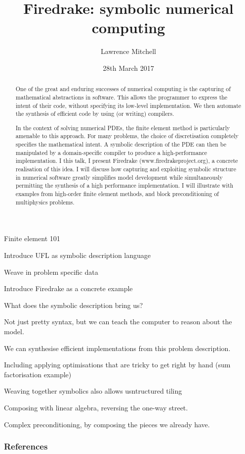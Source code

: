 \documentclass[presentation]{beamer}
\date{28th March 2017}
\author{Lawrence Mitchell\inst{1,*}}
\institute{
\inst{1}Departments of Computing and Mathematics, Imperial College
London

\inst{*}\texttt{lawrence.mitchell@imperial.ac.uk}
}
\title{Firedrake: symbolic numerical computing}
\begin{document}
\maketitle

\begin{abstract}
  One of the great and enduring successes of numerical computing is
  the capturing of mathematical abstractions in software.  This allows
  the programmer to express the intent of their code, without
  specifying its low-level implementation.  We then automate the
  synthesis of efficient code by using (or writing) compilers.

  In the context of solving numerical PDEs, the finite element method
  is particularly amenable to this approach.  For many problems, the
  choice of discretisation completely specifies the mathematical
  intent.  A symbolic description of the PDE can then be manipulated
  by a domain-specific compiler to produce a high-performance
  implementation.  I this talk, I present Firedrake
  (www.firedrakeproject.org), a concrete realisation of this idea.  I
  will discuss how capturing and exploiting symbolic structure in
  numerical software greatly simplifies model development while
  simultaneously permitting the synthesis of a high performance
  implementation.  I will illustrate with examples from high-order
  finite element methods, and block preconditioning of multiphysics
  problems.
\end{abstract}

\begin{frame}
  Finite element 101

  Introduce UFL as symbolic description language

  Weave in problem specific data

  Introduce Firedrake as a concrete example

  What does the symbolic description bring us?

  Not just pretty syntax, but we can teach the computer to reason
  about the model.

  We can synthesise efficient implementations from this problem
  description.

  Including applying optimisations that are tricky to get right by
  hand (sum factorisation example)

  Weaving together symbolics also allows usntructured tiling

  Composing with linear algebra, reversing the one-way street.

  Complex preconditioning, by composing the pieces we already have.
\end{frame}
\appendix
\begin{frame}[t,allowframebreaks]
  \frametitle{References}
  \printbibliography[heading=none]
\end{frame}
\end{document}
